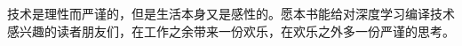 
\begin{pre}
	\thispagestyle{empty}
	\begin{center}
		{}
	\end{center}

\vspace*{5\baselineskip}

技术是理性而严谨的，但是生活本身又是感性的。愿本书能给对深度学习编译技术感兴趣的读者朋友们，在工作之余带来一份欢乐，在欢乐之外多一份严谨的思考。
\end{pre}
